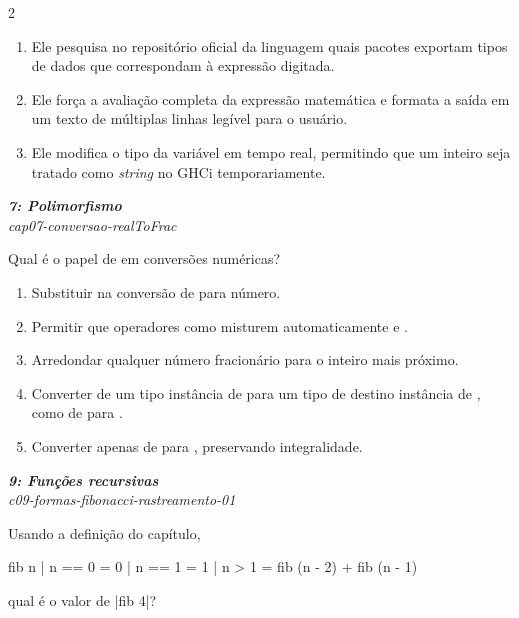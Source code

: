 \documentclass[a4paper,10pt,brazil]{article}
\begin{document}
\begin{multicols}{2}
\begin{enumerate}
  \item Ele pesquisa no repositório oficial da linguagem quais pacotes exportam tipos de dados que correspondam à expressão digitada.

  \item Ele força a avaliação completa da expressão matemática e formata a saída em um texto de múltiplas linhas legível para o usuário.

  \item Ele modifica o tipo da variável em tempo real, permitindo que um inteiro seja tratado como \emph{string} no GHCi temporariamente.


\end{enumerate}

\begin{flushright}
  \footnotesize
  \textit{\textbf{7: Polimorfismo}}\\
  \textit{cap07-conversao-realToFrac}\\

\end{flushright}
Qual é o papel de  em conversões numéricas?
\begin{enumerate}
  \item Substituir  na conversão de  para número.
  \item Permitir que operadores como \haskellinline{(+)} misturem automaticamente  e .
  \item Arredondar qualquer número fracionário para o inteiro mais próximo.
  \item Converter de um tipo instância de  para um tipo de destino instância de , como de  para .
  \item Converter apenas de  para , preservando integralidade.

\end{enumerate}

\begin{flushright}
  \footnotesize
  \textit{\textbf{9: Funções recursivas}}\\
  \textit{c09-formas-fibonacci-rastreamento-01}\\

\end{flushright}
Usando a definição do capítulo,
\begin{haskellcode}
fib n
  | n == 0 = 0
  | n == 1 = 1
  | n > 1  = fib (n - 2) + fib (n - 1)
\end{haskellcode}
qual é o valor de \haskellinline|fib 4|?


\end{multicols}
\end{document}
